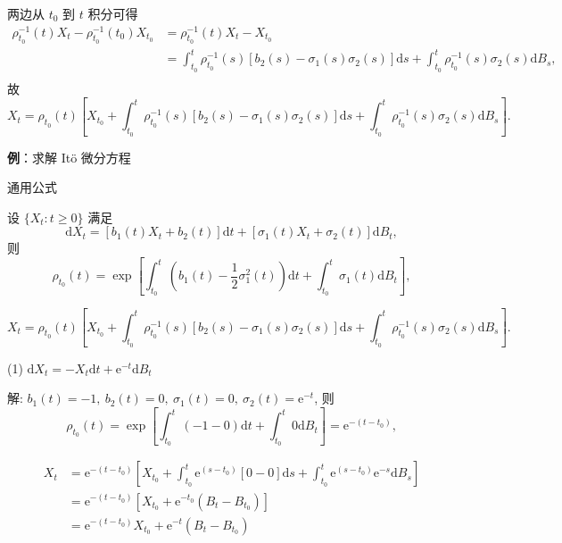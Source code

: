 \documentclass[openany]{ctexbook}
\theoremstyle{kaiti}
\theoremstyle{normal}
\begin{document}
两边从 $t_0$ 到 $t$ 积分可得
\begin{equation}
  \begin{aligned}
    \rho_{t_0}^{-1}(t)X_t-\rho_{t_0}^{-1}(t_0)X_{t_0}
    &=\rho_{t_0}^{-1}(t)X_t-X_{t_0}\\
    &=\int_{t_0}^t\rho_{t_0}^{-1}(s)[b_2(s)-\sigma_1(s)\sigma_2(s)]\mathrm{d}s+\int_{t_0}^t\rho_{t_0}^{-1}(s)\sigma_2(s)\mathrm{d}B_s,\\
  \end{aligned}
\end{equation}
故
\begin{equation}
  X_t=\rho_{t_0}(t)\left[X_{t_0}+\int_{t_0}^t\rho_{t_0}^{-1}(s)[b_2(s)-\sigma_1(s)\sigma_2(s)]\mathrm{d}s+\int_{t_0}^t\rho_{t_0}^{-1}(s)\sigma_2(s)\mathrm{d}B_s\right].
\end{equation}

\textbf{例}：求解 It\"o 微分方程

通用公式

设 $\{X_t:t\geqslant0\}$ 满足
\begin{equation}
  \mathrm{d}X_t=[b_1(t) X_t+b_2(t)]\mathrm{d}t+[\sigma_1(t) X_t+\sigma_2(t)]\mathrm{d}B_t,
\end{equation}
则
\begin{equation}
  \rho_{t_0}(t)=\exp\left[\int_{t_0}^t\left(b_1(t)-\frac{1}{2}\sigma_1^2(t)\right)\mathrm{d}t+\int_{t_0}^t\sigma_1(t) \mathrm{d}B_t\right],
\end{equation}

\begin{equation}
  X_t=\rho_{t_0}(t)\left[X_{t_0}+\int_{t_0}^t\rho_{t_0}^{-1}(s)[b_2(s)-\sigma_1(s)\sigma_2(s)]\mathrm{d}s+\int_{t_0}^t\rho_{t_0}^{-1}(s)\sigma_2(s)\mathrm{d}B_s\right].
\end{equation}

(1) $\mathrm{d}X_t=-X_t\mathrm{d}t+\mathrm{e}^{-t}\mathrm{d}B_t$

解: $b_1(t)=-1,~b_2(t)=0,~\sigma_1(t)=0,~\sigma_2(t)=\mathrm{e}^{-t}$, 则
\begin{equation}
  \rho_{t_0}(t)=\exp\left[\int_{t_0}^t\left(-1-0\right)\mathrm{d}t+\int_{t_0}^t0 \mathrm{d}B_t\right]=\mathrm{e}^{-(t-t_0)},
\end{equation}

\begin{equation}
  \begin{aligned}
    X_t
    &=\mathrm{e}^{-(t-t_0)}\left[X_{t_0}+\int_{t_0}^t\mathrm{e}^{(s-t_0)}[0-0]\mathrm{d}s+\int_{t_0}^t\mathrm{e}^{(s-t_0)}\mathrm{e}^{-s}\mathrm{d}B_s\right]\\
    &=\mathrm{e}^{-(t-t_0)}\left[X_{t_0}+\mathrm{e}^{-t_0}(B_t-B_{t_0})\right]\\
    &=\mathrm{e}^{-(t-t_0)}X_{t_0}+\mathrm{e}^{-t}(B_t-B_{t_0})\\
  \end{aligned}
\end{equation}
\end{document}
